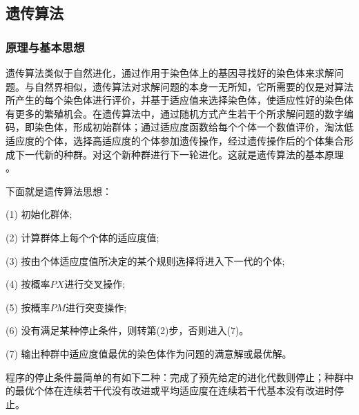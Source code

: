 \documentclass[10.5pt,twocolumn]{jbuaa}
\begin{document}
\subsection{遗传算法}
\subsubsection{原理与基本思想}
遗传算法类似于自然进化，通过作用于染色体上的基因寻找好的染色体来求解问题。与自然界相似，遗传算法对求解问题的本身一无所知，它所需要的仅是对算法所产生的每个染色体进行评价，并基于适应值来选择染色体，使适应性好的染色体有更多的繁殖机会。在遗传算法中，通过随机方式产生若干个所求解问题的数字编码，即染色体，形成初始群体；通过适应度函数给每个个体一个数值评价，淘汰低适应度的个体，选择高适应度的个体参加遗传操作，经过遗传操作后的个体集合形成下一代新的种群。对这个新种群进行下一轮进化。这就是遗传算法的基本原理 。 

下面就是遗传算法思想：

(1) 初始化群体;    

(2) 计算群体上每个个体的适应度值;    

(3) 按由个体适应度值所决定的某个规则选择将进入下一代的个体;   

(4) 按概率$PX$进行交叉操作;   

(5) 按概率$PM$进行突变操作;    

(6) 没有满足某种停止条件，则转第(2)步，否则进入(7)。    

(7) 输出种群中适应度值最优的染色体作为问题的满意解或最优解。   

程序的停止条件最简单的有如下二种：完成了预先给定的进化代数则停止；种群中的最优个体在连续若干代没有改进或平均适应度在连续若干代基本没有改进时停止。
\end{document}
